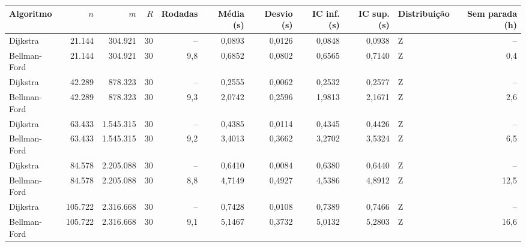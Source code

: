 \begin{tabular}{lrrrrrrrrlr}
\toprule
Algoritmo & $n$ & $m$ & $R$ & Rodadas & Média (s) & Desvio (s) & IC inf. (s) & IC sup. (s) & Distribuição & Sem parada (h) \\
\midrule
Dijkstra & 21.144 & 304.921 & 30 & -- & 0,0893 & 0,0126 & 0,0848 & 0,0938 & Z & -- \\
Bellman-Ford & 21.144 & 304.921 & 30 & 9,8 & 0,6852 & 0,0802 & 0,6565 & 0,7140 & Z & 0,4 \\
Dijkstra & 42.289 & 878.323 & 30 & -- & 0,2555 & 0,0062 & 0,2532 & 0,2577 & Z & -- \\
Bellman-Ford & 42.289 & 878.323 & 30 & 9,3 & 2,0742 & 0,2596 & 1,9813 & 2,1671 & Z & 2,6 \\
Dijkstra & 63.433 & 1.545.315 & 30 & -- & 0,4385 & 0,0114 & 0,4345 & 0,4426 & Z & -- \\
Bellman-Ford & 63.433 & 1.545.315 & 30 & 9,2 & 3,4013 & 0,3662 & 3,2702 & 3,5324 & Z & 6,5 \\
Dijkstra & 84.578 & 2.205.088 & 30 & -- & 0,6410 & 0,0084 & 0,6380 & 0,6440 & Z & -- \\
Bellman-Ford & 84.578 & 2.205.088 & 30 & 8,8 & 4,7149 & 0,4927 & 4,5386 & 4,8912 & Z & 12,5 \\
Dijkstra & 105.722 & 2.316.668 & 30 & -- & 0,7428 & 0,0108 & 0,7389 & 0,7466 & Z & -- \\
Bellman-Ford & 105.722 & 2.316.668 & 30 & 9,1 & 5,1467 & 0,3732 & 5,0132 & 5,2803 & Z & 16,6 \\
\bottomrule
\end{tabular}

